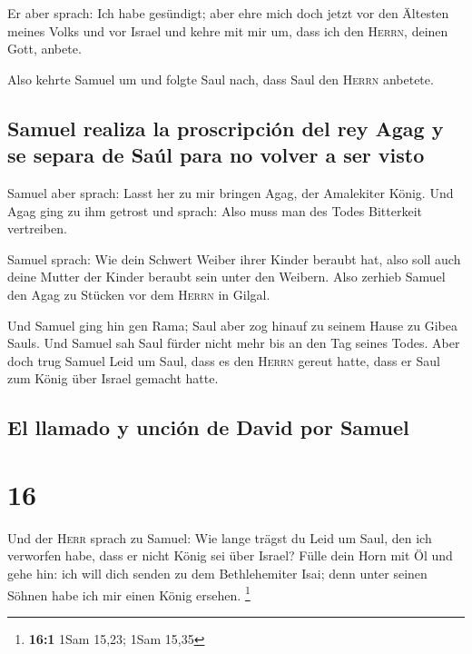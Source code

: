  Er aber sprach: Ich habe gesündigt; aber ehre mich doch
jetzt vor den Ältesten meines Volks und vor Israel und kehre mit mir um,
dass ich den \textsc{Herrn}, deinen Gott, anbete.

 Also kehrte Samuel um und folgte Saul nach, dass Saul
den \textsc{Herrn} anbetete.

\hypertarget{samuel-realiza-la-proscripciuxf3n-del-rey-agag-y-se-separa-de-sauxfal-para-no-volver-a-ser-visto}{%
\subsection{Samuel realiza la proscripción del rey Agag y se separa de
Saúl para no volver a ser
visto}\label{samuel-realiza-la-proscripciuxf3n-del-rey-agag-y-se-separa-de-sauxfal-para-no-volver-a-ser-visto}}

 Samuel aber sprach: Lasst her zu mir bringen Agag, der
Amalekiter König. Und Agag ging zu ihm getrost und sprach: Also muss man
des Todes Bitterkeit vertreiben.

 Samuel sprach: Wie dein Schwert Weiber ihrer Kinder
beraubt hat, also soll auch deine Mutter der Kinder beraubt sein unter
den Weibern. Also zerhieb Samuel den Agag zu Stücken vor dem
\textsc{Herrn} in Gilgal.

 Und Samuel ging hin gen Rama; Saul aber zog hinauf zu
seinem Hause zu Gibea Sauls.  Und Samuel sah Saul fürder
nicht mehr bis an den Tag seines Todes. Aber doch trug Samuel Leid um
Saul, dass es den \textsc{Herrn} gereut hatte, dass er Saul zum König
über Israel gemacht hatte.

\hypertarget{el-llamado-y-unciuxf3n-de-david-por-samuel}{%
\subsection{El llamado y unción de David por
Samuel}\label{el-llamado-y-unciuxf3n-de-david-por-samuel}}

\hypertarget{section-15}{%
\section{16}\label{section-15}}

 Und der \textsc{Herr} sprach zu Samuel: Wie lange trägst
du Leid um Saul, den ich verworfen habe, dass er nicht König sei über
Israel? Fülle dein Horn mit Öl und gehe hin: ich will dich senden zu dem
Bethlehemiter Isai; denn unter seinen Söhnen habe ich mir einen König
ersehen. \footnote{\textbf{16:1} 1Sam 15,23; 1Sam 15,35}

